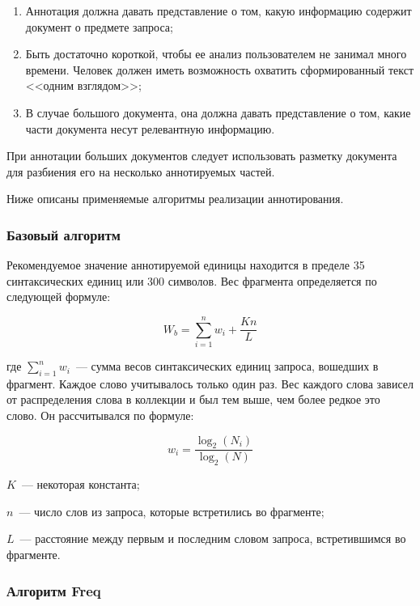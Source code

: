\documentclass[a4paper,14pt,russian]{extreport}
\begin{document}
\begin{enumerate}
\item Аннотация должна давать представление о том, какую информацию содержит документ о предмете запроса;
\item Быть достаточно короткой, чтобы ее анализ пользователем не занимал много времени. Человек должен иметь возможность охватить сформированный текст <<одним взглядом>>;
\item В случае большого документа, она должна давать представление о том, какие части документа несут релевантную информацию.
\end{enumerate}

При аннотации больших документов следует использовать разметку документа для разбиения его на несколько аннотируемых частей.

Ниже описаны применяемые алгоритмы реализации аннотирования.

\subsubsection{Базовый алгоритм}

Рекомендуемое значение аннотируемой единицы находится в пределе 35 синтаксических единиц или 300 символов. Вес фрагмента определяется по следующей формуле:

\begin{equation}
	W_b=\sum\limits_{i=1}^n w_i + \dfrac{Kn}{L}
\end{equation}

где $\sum\limits_{i=1}^n w_i$~--- сумма весов синтаксических единиц запроса, вошедших в фрагмент. Каждое слово учитывалось только один раз. Вес каждого слова зависел от распределения слова в коллекции и был тем выше, чем более редкое это слово. Он рассчитывался по формуле:

\begin{equation}
	w_i = \dfrac{\log_2\left(N_i\right)}{\log_2\left(N\right)}
\end{equation}

$K$~--- некоторая константа;

$n$~--- число слов из запроса, которые встретились во фрагменте;

$L$~--- расстояние между первым и последним словом запроса, встретившимся во фрагменте.

\subsubsection{Алгоритм Freq}
\end{document}
